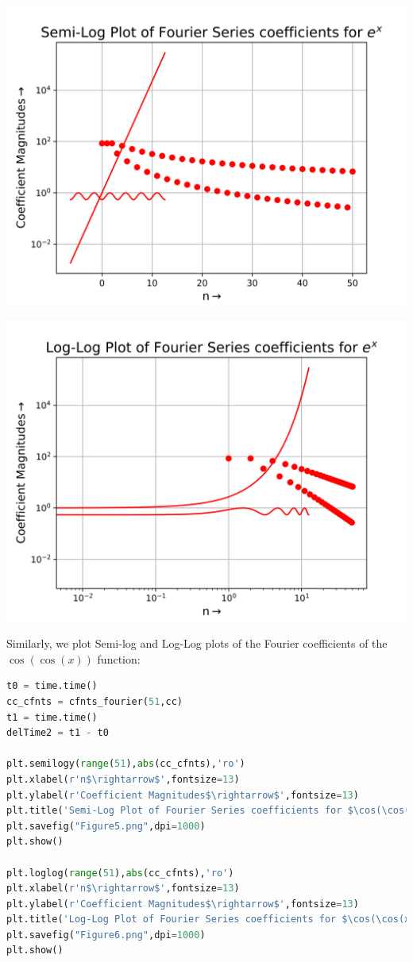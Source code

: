 \documentclass[12pt]{article}
\begin{document}
\begin{center}
    \includegraphics[scale=0.8]{images/Figure3.png}
\end{center}    
    
\begin{center}
    \includegraphics[scale=0.8]{images/Figure4.png}
\end{center}


\pagebreak
Similarly, we plot Semi-log and Log-Log plots of the Fourier coefficients of the $\cos(\cos(x))$ function:

\begin{lstlisting}[language=Python]
t0 = time.time()
cc_cfnts = cfnts_fourier(51,cc)
t1 = time.time()
delTime2 = t1 - t0

plt.semilogy(range(51),abs(cc_cfnts),'ro')
plt.xlabel(r'n$\rightarrow$',fontsize=13)
plt.ylabel(r'Coefficient Magnitudes$\rightarrow$',fontsize=13)
plt.title('Semi-Log Plot of Fourier Series coefficients for $\cos(\cos(x))$',fontsize=16)
plt.savefig("Figure5.png",dpi=1000)
plt.show()

plt.loglog(range(51),abs(cc_cfnts),'ro')
plt.xlabel(r'n$\rightarrow$',fontsize=13)
plt.ylabel(r'Coefficient Magnitudes$\rightarrow$',fontsize=13)
plt.title('Log-Log Plot of Fourier Series coefficients for $\cos(\cos(x))$',fontsize=16)
plt.savefig("Figure6.png",dpi=1000)
plt.show()
\end{lstlisting}
\end{document}
